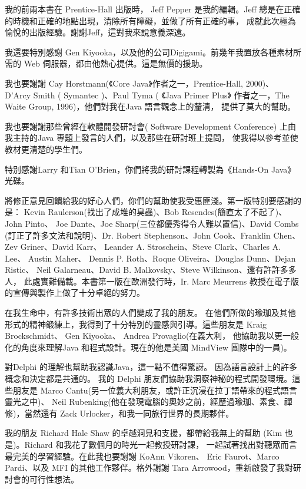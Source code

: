 我的前兩本書在 Prentice-Hall 出版時， Jeff Pepper 是我的編輯。Jeff
總是在正確的時機和正確的地點出現，清除所有障礙，並做了所有正確的事，
成就此次極為愉悅的出版經驗。謝謝Jeff，這對我來說意義深遠。

我還要特別感謝 Gen Kiyooka，以及他的公司Digigami。前幾年我置放各種素材所需的
Web 伺服器，都由他熱心提供。這是無價的援助。

我也要謝謝 Cay Horstmann(《Core Java》作者之一，Prentice-Hall, 2000)、
D'Arcy Smith ( Symantec )、Paul Tyma ( 《Java Primer Plus》
作者之一，The Waite Group, 1996)，他們對我在Java 語言觀念上的釐清，
提供了莫大的幫助。

我也要謝謝那些曾經在軟體開發研討會( Software Development Conference)
上由我主持的Java 專題上發言的人們，以及那些在研討班上提問，
使我得以參考並使教材更清楚的學生們。

特別感謝Larry 和Tian O'Brien，你們將我的研討課程轉製為《Hands-On Java》光碟。

將修正意見回饋給我的好心人們，你們的幫助使我受惠匪淺。第一版特別要感謝的是：
Kevin Raulerson(找出了成堆的臭蟲)、Bob Resendes(簡直太了不起了)、John Pinto、
Joe Dante、Joe Sharp(三位都優秀得令人難以置信)、David Combs
(訂正了許多文法和說明)、Dr. Robert Stephenson、John Cook、Franklin Chen、
Zev Griner、David Karr、 Leander A. Stroschein、Steve Clark、Charles A. Lee、
Austin Maher、 Dennis P. Roth、Roque Oliveira、Douglas Dunn、Dejan Ristic、
Neil Galarneau、David B. Malkovsky、Steve Wilkinson、還有許許多多人，
此處實難備載。本書第一版在歐洲發行時，Ir. Marc Meurrens
教授在電子版的宣傳與製作上做了十分卓絕的努力。

在我生命中，有許多技術出眾的人們變成了我的朋友。
在他們所做的瑜珈及其他形式的精神鍛練上，我得到了十分特別的靈感與引導。這些朋友是
Kraig Brockschmidt、 Gen Kiyooka、 Andrea Provaglio(在義大利，
他協助我以更一般化的角度來理解Java 和程式設計。現在的他是美國
MindView 團隊中的一員)。

對Delphi 的理解也幫助我認識Java，這一點不值得驚訝。
因為語言設計上的許多概念和決定都是共通的。
我的 Delphi 朋友們協助我洞察神秘的程式開發環境。這些朋友是
Marco Cantu(另一位義大利朋友，或許正沉浸在拉丁語帶來的程式語言靈光之中)、
Neil Rubenking(他在發現電腦的奧妙之前，經歷過瑜珈、素食、禪修)，當然還有
Zack Urlocker，和我一同旅行世界的長期夥伴。

我的朋友 Richard Hale Shaw 的卓越洞見和支援，都帶給我無上的幫助
(Kim 也是)。Richard 和我花了數個月的時光一起教授研討課，
一起試著找出對聽眾而言最完美的學習經驗。在此我也要謝謝
KoAnn Vikoren、 Eric Faurot、Marco Pardi、以及
MFI 的其他工作夥伴。格外謝謝 Tara Arrowood，重新啟發了我對研討會的可行性想法。

